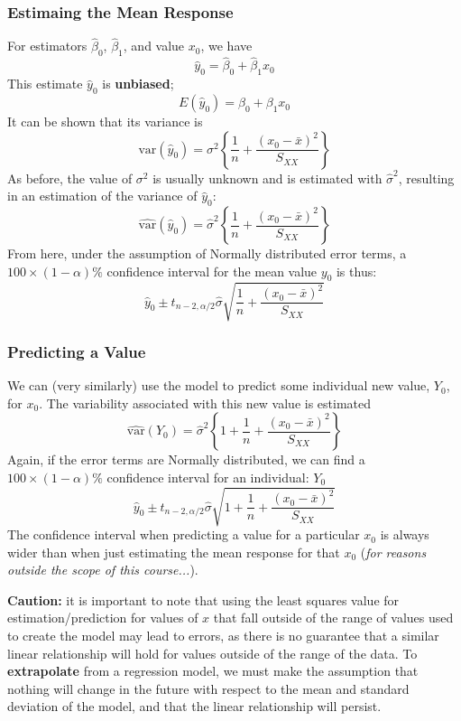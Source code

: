 \documentclass[12pt]{article}
\begin{document}
\subsubsection{Estimaing the Mean Response}

For estimators $\hat{\beta}_0$, $\hat{\beta}_1$, and value $x_0$, we have\[\hat{y}_0 = \hat{\beta}_0 + \hat{\beta}_1 x_0\] This estimate $\hat{y}_0$ is \textbf{unbiased};\[E(\hat{y}_0) = \beta_0 + \beta_1 x_0\] It can be shown that its variance is\[\text{var}(\hat{y}_0) = \sigma^2 \left\{\frac{1}{n} + \frac{(x_0 - \bar{x})^2}{S_{XX}}\right\}\]As before, the value of $\sigma^2$ is usually unknown and is estimated with $\hat{\sigma}^2$, resulting in an estimation of the variance of $\hat{y}_0$:\[\widehat{\text{var}}(\hat{y}_0) = \hat{\sigma}^2 \left\{\frac{1}{n} + \frac{(x_0-\bar{x})^2}{S_{XX}}\right\}\]From here, under the assumption of Normally distributed error terms, a $100 \times (1- \alpha)\%$ confidence interval for the mean value $y_0$ is thus:\[\hat{y}_0\pm t_{n-2, \alpha/2}\hat{\sigma}\sqrt{\frac{1}{n} + \frac{(x_0 - \bar{x})^2}{S_{XX}}}\]

\subsubsection{Predicting a Value}
We can (very similarly) use the model to predict some individual new value, $Y_0$, for $x_0$. The variability associated with this new value is estimated \[\widehat{\text{var}}(Y_0) = \hat{\sigma}^2 \left\{1 + \frac{1}{n} + \frac{(x_0 - \bar{x})^2}{S_{XX}}\right\}\] Again, if the error terms are Normally distributed, we can find a $100 \times (1-\alpha)\%$ confidence interval for an individual: $Y_0$\[\hat{y}_0 \pm t_{n-2, \alpha/2} \hat{\sigma} \sqrt{1 + \frac{1}{n} + \frac{(x_0-\bar{x})^2}{S_{XX}}}\]The confidence interval when predicting a value for a particular $x_0$ is always wider than when just estimating the mean response for that $x_0$ (\textit{for reasons outside the scope of this course...}).

\textbf{Caution:} it is important to note that using the least squares value for estimation/prediction for values of $x$ that fall outside of the range of values used to create the model may lead to errors, as there is no guarantee that a similar linear relationship will hold for values outside of the range of the data. To \textbf{extrapolate} from a regression model, we must make the assumption that nothing will change in the future with respect to the mean and standard deviation of the model, and that the linear relationship will persist.
\end{document}
